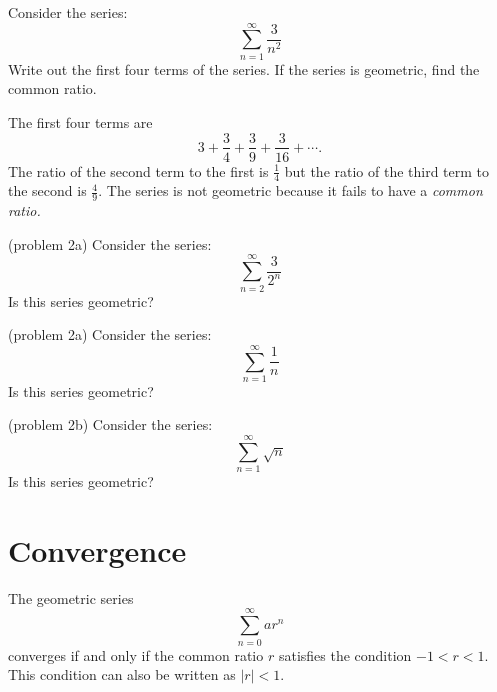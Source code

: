 \documentclass{ximera}
\begin{document}
 
 \begin{example}[example 2]
 Consider the series:
\[
 \sum_{n=1}^\infty \frac{3}{n^2} 
 \]
 Write out the first four terms of the series. If the series is geometric, find the common ratio.
 
 The first four terms are 
 \[
 3 + \frac34 + \frac39 + \frac{3}{16} + \cdots.
 \]
 The ratio of the second term to the first is $\frac14$ but the ratio of the third term to the second is $\frac49$.
 The series is not geometric because it fails to have a \it{common} ratio.
 
 \end{example}
 
 
  \begin{problem}(problem 2a)
 Consider the series:
 \[
 \sum_{n=2}^\infty \frac{3}{2^n} 
 \]
 Is this series geometric?
 \begin{multipleChoice}
 \end{multipleChoice}
 
 \end{problem}
 
 
   \begin{problem}(problem 2a)
 Consider the series:
 \[
 \sum_{n=1}^\infty \frac{1}{n} 
 \]
 Is this series geometric?
 \begin{multipleChoice}
 \end{multipleChoice}
 
 \end{problem}
 

   \begin{problem}(problem 2b)
 Consider the series:
 \[
 \sum_{n=1}^\infty \sqrt n 
 \]
 Is this series geometric?
 \begin{multipleChoice}
 \end{multipleChoice}
 
 \end{problem}
 
 
\section{Convergence}

\begin{theorem} 
The geometric series
\[
\sum_{n=0}^\infty ar^n
\]
converges if and only if the common ratio $r$ satisfies the condition $-1 < r < 1$.
This condition can also be written as $|r| < 1$.
\end{theorem}
\end{document}
